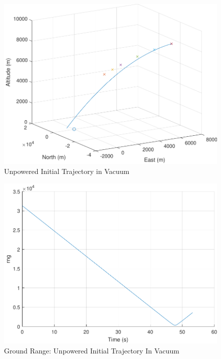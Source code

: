 \begin{figure}[H]
	\centering
	\begin{minipage}{4.3 in}
		\includegraphics[width=\linewidth]{Figures/trajunpowvac_1.pdf}
		\caption{Unpowered Initial Trajectory in Vacuum \label{fig:trajunpowvac_1} }
	\end{minipage}
\end{figure}

\begin{figure}[H]
	\centering
	\begin{minipage}{4.3 in}
		\includegraphics[width=\linewidth]{Figures/trajunpowvacgr.pdf}
		\caption{Ground Range: Unpowered Initial Trajectory In Vacuum \label{fig:trajunpowvacgr} }
	\end{minipage}
\end{figure}

